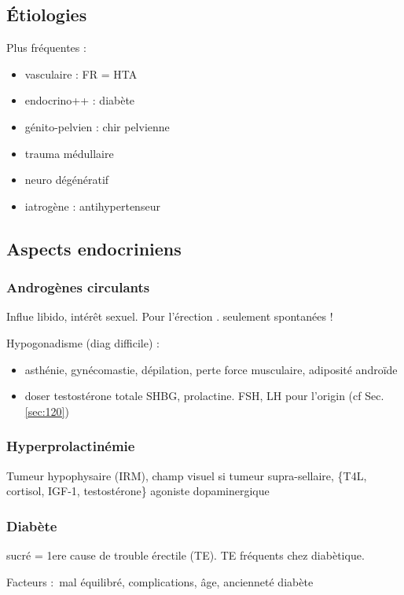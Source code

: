 \documentclass[11pt]{article}
\begin{document}
\subsection{Étiologies}
\label{sec:org3dff198}
Plus fréquentes :
\begin{itemize}
\item vasculaire : FR = HTA
\item endocrino++ : diabète
\item génito-pelvien : chir pelvienne
\item trauma médullaire
\item neuro dégénératif
\item iatrogène : antihypertenseur
\end{itemize}

\subsection{Aspects endocriniens}
\label{sec:org60bafa3}
\subsubsection{Androgènes circulants}
\label{sec:org3b9fff1}
Influe libido, intérêt sexuel. Pour l'érection . seulement spontanées !

Hypogonadisme (diag difficile) : 
\begin{itemize}
\item asthénie, gynécomastie, dépilation, perte force musculaire, adiposité androïde
\item doser testostérone totale \textpm{} SHBG, prolactine. FSH, LH pour l'origin (cf
Sec. \ref{sec:120})
\end{itemize}

\subsubsection{Hyperprolactinémie}
\label{sec:org29fdb4a}
Tumeur hypophysaire (IRM), champ visuel si tumeur
supra-sellaire, \{T4L, cortisol, IGF-1, testostérone\}
\thus agoniste dopaminergique

\subsubsection{Diabète}
\label{sec:org4912283}
sucré = 1ere cause de trouble érectile (TE). TE fréquents chez diabètique. 

Facteurs : mal équilibré, complications, âge, ancienneté diabète
\end{document}
